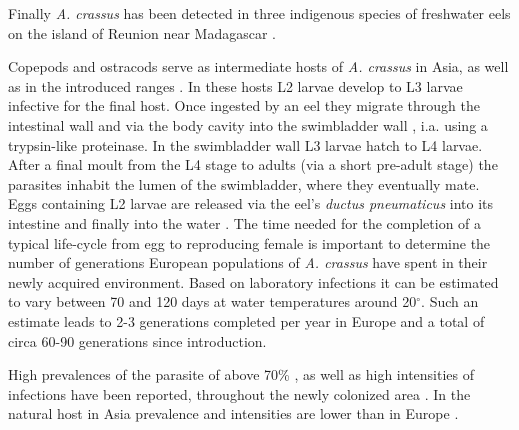 Finally \textit{A. crassus} has been detected in three indigenous
species of freshwater eels on the island of Reunion near Madagascar
\cite{sasal_parasite_2008}.

Copepods and ostracods serve as intermediate hosts of
\textit{A. crassus} in Asia, as well as in the introduced ranges
\cite{moravec_first_2005}. In these hosts L2 larvae develop to L3
larvae infective for the final host. Once ingested by an eel they
migrate through the intestinal wall and via the body cavity into the
swimbladder wall \cite{haenen_effects_1996}, i.a. using a trypsin-like
proteinase\cite{polzer_identification_1993}. In the swimbladder wall
L3 larvae hatch to L4 larvae. After a final moult from the L4 stage to
adults (via a short pre-adult stage) the parasites inhabit the lumen
of the swimbladder, where they eventually mate. Eggs containing L2
larvae are released via the eel's \textit{ductus pneumaticus} into its
intestine and finally into the water
\cite{de_charleroy_life_1990}. The time needed for the completion of a
typical life-cycle from egg to reproducing female is important to
determine the number of generations European populations of
\textit{A. crassus} have spent in their newly acquired
environment. Based on laboratory infections it can be estimated to
vary between 70 and 120 days at water temperatures around
20$^{\circ}$.  Such an estimate leads to 2-3 generations completed per
year in Europe and a total of circa 60-90 generations since
introduction.



High prevalences of the parasite of above 70\%
\cite{wrtz_distribution_1998,thomas1992population}, as well as high
intensities of infections have been reported, throughout the newly
colonized area \cite{lefebvre_anguillicolosis:_2004}. In the natural
host in Asia prevalence and intensities are lower than in Europe
\cite{mnderle_occurrence_2006}.

